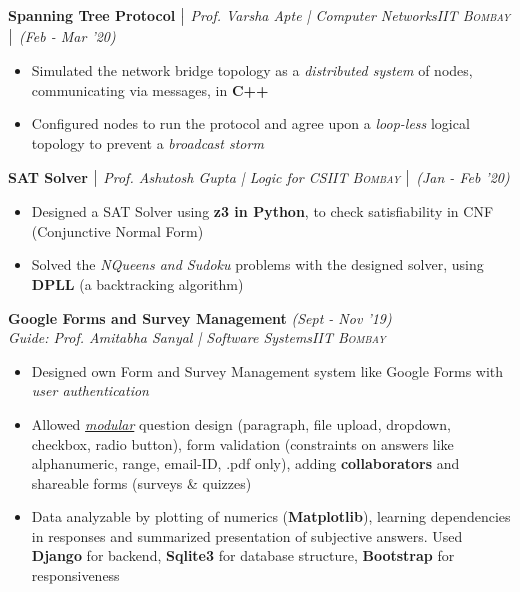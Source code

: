 \documentclass{article}
\begin{document}
\vspace{-5pt}
\textbf{Spanning Tree Protocol} $\bigm|$ {\it Prof. Varsha Apte | Computer Networks}\hfill{\sl \small \textsc{IIT Bombay} $\bigm|$ (Feb - Mar '20)}\\
\vspace{-19pt}
\begin{itemize}[itemsep = -1 mm, leftmargin=*]
   \item Simulated the network bridge topology as a \textit{distributed system} of nodes, communicating via messages, in \textbf{C++}
    \item Configured nodes to run the protocol and agree upon a \textit{loop-less} logical topology to prevent a \textit{broadcast storm}
\end{itemize}
\vspace{-5pt}
\textbf{SAT Solver} $\bigm|$ {\it Prof. Ashutosh Gupta | Logic for CS}\hfill{\sl \small \textsc{IIT Bombay} $\bigm|$ (Jan - Feb '20)}\\
\vspace{-19pt}
\begin{itemize}[itemsep = -1 mm, leftmargin=*]
   \item Designed a SAT Solver using \textbf{z3 in Python}, to check satisfiability in CNF (Conjunctive Normal Form)
    \item Solved the \textit{NQueens and Sudoku} problems with the designed solver, using \textbf{DPLL} (a backtracking algorithm)
\end{itemize}
\vspace{-5pt}
\textbf{Google Forms and Survey Management} \hfill{\sl \small (Sept - Nov '19)}\\
{\it Guide: Prof. Amitabha Sanyal | Software Systems}\hfill{\sl \small \textsc{IIT Bombay}}\\
\vspace{-19pt}
\begin{itemize}[itemsep = -1 mm, leftmargin=*]
    \item Designed own Form and Survey Management system like Google Forms with \textit{user authentication}
    \item Allowed \textit{\underline{modular}} question design (paragraph, file upload, dropdown, checkbox, radio button), form validation (constraints on answers like alphanumeric, range, email-ID, .pdf only), adding \textbf{collaborators} and shareable forms (surveys \& quizzes)
    \item Data analyzable by plotting of numerics (\textbf{Matplotlib}), learning dependencies in responses and summarized presentation of subjective answers. Used \textbf{Django} for backend, \textbf{Sqlite3} for database structure, \textbf{Bootstrap} for responsiveness
\end{itemize}
\end{document}

